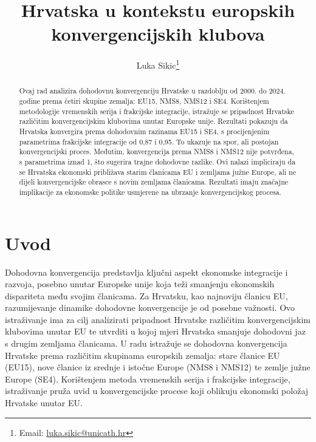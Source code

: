 \documentclass{crebsshr}
\begin{document}
    
    \title{Hrvatska u kontekstu europskih konvergencijskih klubova}
    
    \author[L. Sikic]{Luka Sikic\thanks{Email: \href{mailto:luka.sikic@unicath.hr}{luka.sikic@unicath.hr}}}
    \address{ Croatian Catholic University, Ilica 242, Zagreb, 10000, Croatia}
    
    
    \begin{abstract}
        Ovaj rad analizira dohodovnu konvergenciju Hrvatske u razdoblju od 2000. do 2024. godine prema četiri skupine zemalja: EU15, NMS8, NMS12 i SE4. Korištenjem metodologije vremenskih serija i frakcijske integracije, istražuje se pripadnost Hrvatske različitim konvergencijskim klubovima unutar Europske unije. Rezultati pokazuju da Hrvatska konvergira prema dohodovnim razinama EU15 i SE4, s procijenjenim parametrima frakcijske integracije od 0,87 i 0,95. To ukazuje na spor, ali postojan konvergencijski proces. Međutim, konvergencija prema NMS8 i NMS12 nije potvrđena, s parametrima iznad 1, što sugerira trajne dohodovne razlike. Ovi nalazi impliciraju da se Hrvatska ekonomski približava starim članicama EU i zemljama južne Europe, ali ne dijeli konvergencijske obrasce s novim zemljama članicama. Rezultati imaju značajne implikacije za ekonomske politike usmjerene na ubrzanje konvergencijskog procesa.
    \end{abstract}

    \maketitle
    \bigskip
    \noindent

    \section{Uvod}

    Dohodovna konvergencija predstavlja ključni aspekt ekonomske integracije i razvoja, posebno unutar Europske unije koja teži smanjenju ekonomskih dispariteta među svojim članicama. Za Hrvatsku, kao najnoviju članicu EU, razumijevanje dinamike dohodovne konvergencije je od posebne važnosti. Ovo istraživanje ima za cilj analizirati pripadnost Hrvatske različitim konvergencijskim klubovima unutar EU te utvrditi u kojoj mjeri Hrvatska smanjuje dohodovni jaz s drugim zemljama članicama. U radu istražuje se dohodovna konvergencija Hrvatske prema različitim skupinama europskih zemalja: stare članice EU (EU15), nove članice iz srednje i istočne Europe (NMS8 i NMS12) te zemlje južne Europe (SE4). Korištenjem metoda vremenskih serija i frakcijske integracije, istraživanje pruža uvid u konvergencijske procese koji oblikuju ekonomski položaj Hrvatske unutar EU.
    
\end{document}
